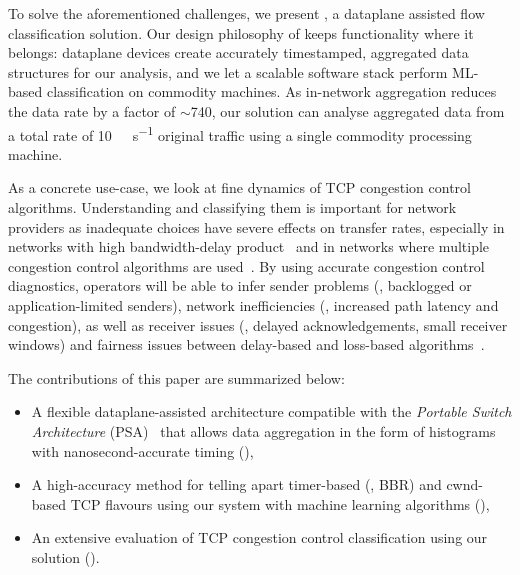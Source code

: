 
To solve the aforementioned challenges, we present \seidr{}, a dataplane assisted flow classification solution.
Our design philosophy of \seidr{} keeps functionality where it belongs: dataplane devices create accurately timestamped, aggregated data structures for our analysis, and we let a scalable software stack perform ML-based classification on commodity machines.
As in-network aggregation reduces the data rate by a factor of $\sim$\num{740}, our solution can analyse aggregated data from a total rate of \SI{10}{\tera\bit\per\second} original traffic using a single commodity processing machine.

As a concrete use-case, we look at fine dynamics of TCP congestion control algorithms.
Understanding and classifying them is important for network providers as inadequate choices have severe effects on transfer rates, especially in networks with high bandwidth-delay product~\parencite{DBLP:journals/queue/CardwellCGYJ16} and in networks where multiple congestion control algorithms are used~\parencite{DBLP:conf/imc/WareMSS19}. 
By using accurate congestion control diagnostics, operators will be able to infer sender problems (\eg, backlogged or application-limited senders), network inefficiencies (\eg, increased path latency and congestion), as well as receiver issues (\eg, delayed acknowledgements, small receiver windows) and fairness issues between delay-based and loss-based algorithms~\parencite{DBLP:conf/imc/WareMSS19}.

The contributions of this paper are summarized below:
\begin{itemize}
	\item A flexible dataplane-assisted architecture compatible with the \emph{Portable Switch Architecture} (PSA)~\parencite{p4-psa} that allows data aggregation in the form of histograms with nanosecond-accurate timing (),
	\item A high-accuracy method for telling apart timer-based (\eg, BBR) and cwnd-based TCP flavours using our system with machine learning algorithms (),
	\item An extensive evaluation of TCP congestion control classification using our solution ().
\end{itemize}

